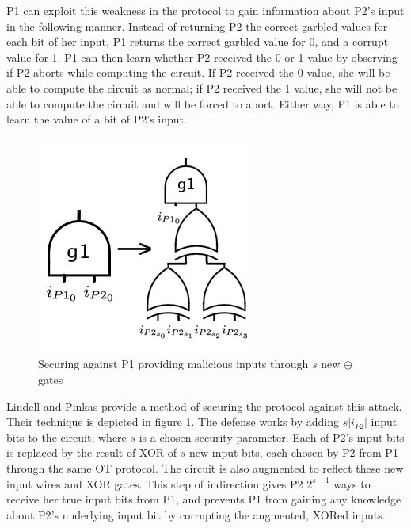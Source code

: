 \ac{P1} can exploit this weakness in the protocol to gain information about \ac{P2}'s input in the following manner.  Instead of returning \ac{P2} the correct garbled values for each bit of her input, \ac{P1} returns the correct garbled value for 0, and a corrupt value for 1.  \ac{P1} can then learn whether \ac{P2} received the 0 or 1 value by observing if \ac{P2} aborts while computing the circuit.  If \ac{P2} received the 0 value, she will be able to compute the circuit as normal; if \ac{P2} received the 1 value, she will not be able to compute the circuit and will be forced to abort.  Either way, \ac{P1} is able to learn the value of a bit of \ac{P2}'s input.

\begin{figure}
    \centering
    \includegraphics[width=\columnwidth]{images/secureing_malicious_inputs}
    \caption{Securing against \ac{P1} providing malicious inputs through $s$ new $\oplus$ gates}
    \label{fig:inputsecure}
\end{figure}

Lindell and Pinkas\cite{lindell2007efficient} provide a method of securing the protocol against this attack.  Their technique is depicted in figure \ref{fig:inputsecure}.  The defense works by adding $s|i_{P2}|$ input bits to the circuit, where $s$ is a chosen security parameter.  Each of \ac{P2}'s input bits is replaced by the result of XOR of $s$ new input bits, each chosen by \ac{P2} from \ac{P1} through the same \ac{OT} protocol.  The circuit is also augmented to reflect these new input wires and XOR gates. This step of indirection gives \ac{P2} $2^{s-1}$ ways to receive her true input bits from \ac{P1}, and prevents \ac{P1} from gaining any knowledge about \ac{P2}'s underlying input bit by corrupting the augmented, XORed inputs.

